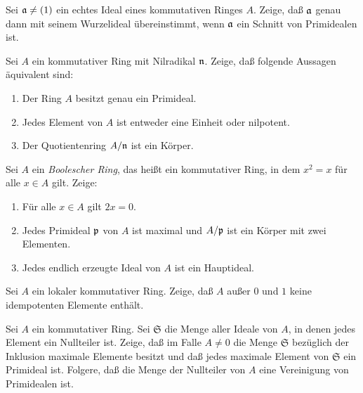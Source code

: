 \begin{exercise}
	\label{exer:radicals}
	Sei \(\mathfrak{a} \neq (1)\) ein echtes Ideal eines kommutativen Ringes \(A\). Zeige,
	daß \(\mathfrak{a}\) genau dann mit seinem Wurzelideal übereinstimmt, wenn
	\(\mathfrak{a}\) ein Schnitt von Primidealen ist.
\end{exercise}

\begin{exercise}
	Sei \(A\) ein kommutativer Ring mit Nilradikal \(\mathfrak{n}\). Zeige, daß folgende
	Aussagen äquivalent sind:
	\begin{enumerate}
	\item
		Der Ring \(A\) besitzt genau ein Primideal.
	\item
		Jedes Element von \(A\) ist entweder eine Einheit oder nilpotent.
	\item
		Der Quotientenring \(A/\mathfrak{n}\) ist ein Körper.
	\end{enumerate}
\end{exercise}

\begin{exercise}
	Sei \(A\) ein \emph{Boolescher Ring}, das heißt ein kommutativer Ring, in dem
	\(x^2 = x\) für alle \(x \in A\) gilt. Zeige:
	\begin{enumerate}
	\item
		Für alle \(x \in A\) gilt \(2 x = 0\).
	\item
		Jedes Primideal \(\mathfrak{p}\) von \(A\) ist maximal und \(A/\mathfrak{p}\) ist
		ein Körper mit zwei Elementen.
	\item
		Jedes endlich erzeugte Ideal von \(A\) ist ein Hauptideal.
	\end{enumerate}
\end{exercise}

\begin{exercise}
	Sei \(A\) ein lokaler kommutativer Ring. Zeige, daß \(A\) außer \(0\) und \(1\)
	keine idempotenten Elemente enthält.
\end{exercise}

\begin{exercise}
	\label{exer:ideals_of_zero_divs}
	Sei \(A\) ein kommutativer Ring. Sei \(\mathfrak S\) die Menge aller Ideale von \(A\),
	in denen jedes Element ein Nullteiler ist. Zeige, daß im Falle \(A \neq 0\) die Menge \(\mathfrak S\) bezüglich
	der Inklusion maximale Elemente besitzt und daß jedes maximale Element von \(\mathfrak S\) ein
	Primideal ist. Folgere, daß die Menge der Nullteiler von \(A\) eine Vereinigung von Primidealen
	ist.
\end{exercise}

